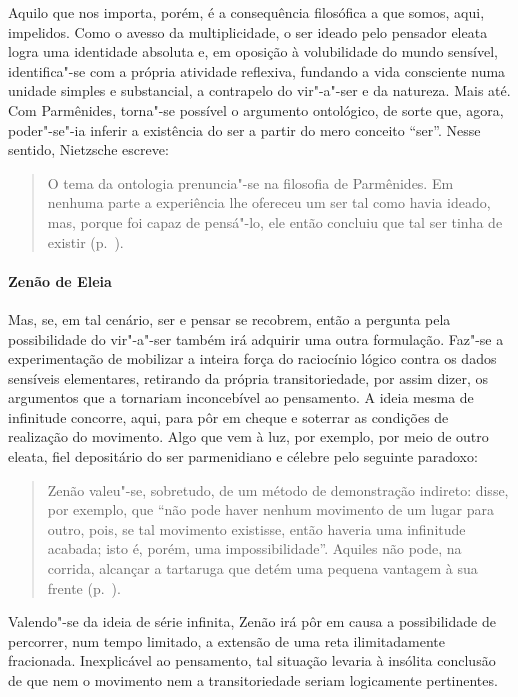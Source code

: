 Aquilo que nos importa, porém, é a consequência filosófica a que somos, aqui,
impelidos. Como o avesso da multiplicidade, o ser ideado pelo pensador eleata
logra uma identidade absoluta e, em oposição à volubilidade do mundo
sensível, identifica"-se com a própria atividade reflexiva, fundando a vida
consciente numa unidade simples e substancial, a contrapelo do vir"-a"-ser e
da natureza. Mais até. Com Parmênides, torna"-se possível o argumento
ontológico, de sorte que, agora, poder"-se"-ia inferir a existência do ser a
partir do mero conceito ``ser''. Nesse sentido, Nietzsche escreve: 

\begin{quote} 
O tema da ontologia prenuncia"-se na filosofia de
 Parmênides. Em nenhuma parte a experiência lhe ofereceu um ser tal como
 havia ideado, mas, porque foi capaz de pensá"-lo, ele então concluiu que tal
 ser tinha de existir (p.~\pageref{temadaontologia}).
\end{quote} 

\paragraph{Zenão de Eleia} Mas, se, em tal cenário, ser e pensar se recobrem,
 então a pergunta pela possibilidade do vir"-a"-ser também irá adquirir uma
 outra formulação. Faz"-se a experimentação de mobilizar a inteira força do
 raciocínio lógico contra os dados sensíveis elementares, retirando da
 própria transitoriedade, por assim dizer, os argumentos que a tornariam
 inconcebível ao pensamento. A ideia mesma de infinitude concorre, aqui, para
 pôr em cheque e soterrar as condições de realização do movimento. Algo que
 vem à luz, por exemplo, por meio de outro eleata, fiel depositário do ser
 parmenidiano e célebre pelo seguinte paradoxo:

\begin{quote} 
Zenão valeu"-se, sobretudo, de um método de demonstração
 indireto: disse, por exemplo, que ``não pode haver nenhum movimento de um
 lugar para outro, pois, se tal movimento existisse, então haveria uma
 infinitude acabada; isto é, porém, uma impossibilidade''. Aquiles não pode,
 na corrida, alcançar a tartaruga que detém uma pequena vantagem à sua
 frente (p.~\pageref{zenaovaleuse}).
\end{quote} 

Valendo"-se da ideia de série infinita, Zenão irá pôr em causa a possibilidade
de percorrer, num tempo limitado, a extensão de uma reta ilimitadamente
fracionada. Inexplicável ao pensamento, tal situação levaria à insólita
conclusão de que nem o movimento nem a transitoriedade seriam logicamente
pertinentes.

